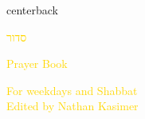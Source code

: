 \documentclass[
coverheight=8.5in,%
coverwidth=5.5in,%
spinewidth=.75in,
bleedwidth=.75in,
marklength=0in,
12pt,
pagecolor=black,
]{bookcover}
\newcommand{\hebtext}[1]{
\begin{hebrew}
	#1
\end{hebrew}
}
\begin{document}
\begin{bookcover}
	\begin{bookcoverelement}{center}{back}
		\begin{Huge}
			\textcolor{gold}{\hebtext{סדור}}
			
			\textcolor{gold}{Prayer Book}
				
		\end{Huge}
		\vspace{2\baselineskip}
		\begin{large}
			\textcolor{gold}{For weekdays and Shabbat\\Edited by Nathan Kasimer}
		\end{large}
	\end{bookcoverelement}
	\end{bookcover}
	
\end{document}
